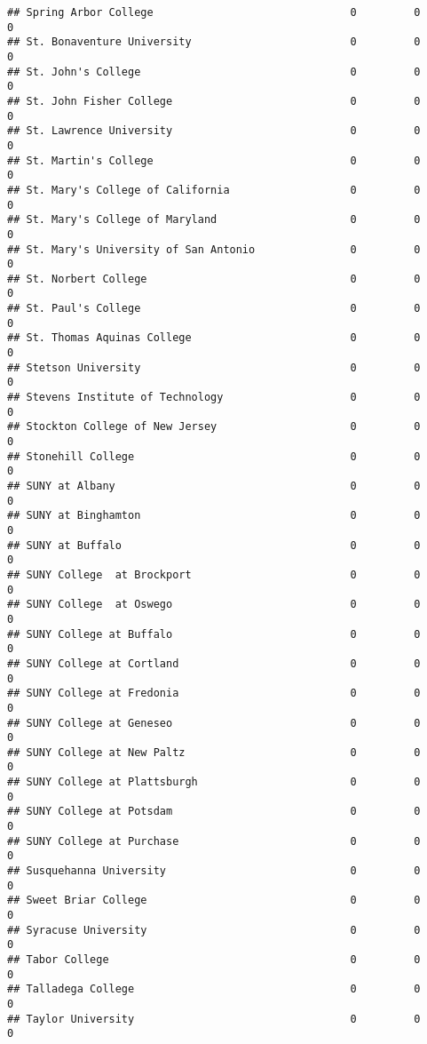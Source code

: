 \documentclass[
]{article}
\begin{document}
\begin{verbatim}
## Spring Arbor College                               0         0         0
## St. Bonaventure University                         0         0         0
## St. John's College                                 0         0         0
## St. John Fisher College                            0         0         0
## St. Lawrence University                            0         0         0
## St. Martin's College                               0         0         0
## St. Mary's College of California                   0         0         0
## St. Mary's College of Maryland                     0         0         0
## St. Mary's University of San Antonio               0         0         0
## St. Norbert College                                0         0         0
## St. Paul's College                                 0         0         0
## St. Thomas Aquinas College                         0         0         0
## Stetson University                                 0         0         0
## Stevens Institute of Technology                    0         0         0
## Stockton College of New Jersey                     0         0         0
## Stonehill College                                  0         0         0
## SUNY at Albany                                     0         0         0
## SUNY at Binghamton                                 0         0         0
## SUNY at Buffalo                                    0         0         0
## SUNY College  at Brockport                         0         0         0
## SUNY College  at Oswego                            0         0         0
## SUNY College at Buffalo                            0         0         0
## SUNY College at Cortland                           0         0         0
## SUNY College at Fredonia                           0         0         0
## SUNY College at Geneseo                            0         0         0
## SUNY College at New Paltz                          0         0         0
## SUNY College at Plattsburgh                        0         0         0
## SUNY College at Potsdam                            0         0         0
## SUNY College at Purchase                           0         0         0
## Susquehanna University                             0         0         0
## Sweet Briar College                                0         0         0
## Syracuse University                                0         0         0
## Tabor College                                      0         0         0
## Talladega College                                  0         0         0
## Taylor University                                  0         0         0

\end{verbatim}
\end{document}
